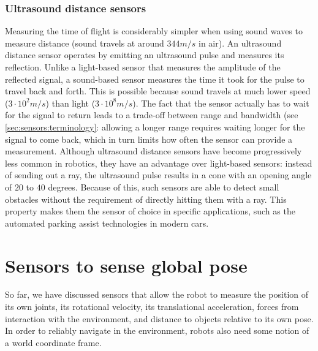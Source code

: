 \subsubsection{Ultrasound distance sensors}
\label{sec:sensors:sound}

Measuring the time of flight is considerably simpler when using sound waves to measure distance (sound travels at around $344m/s$ in air). An ultrasound distance sensor operates by emitting an ultrasound pulse and measures its reflection. Unlike a light-based sensor that measures the amplitude of the reflected signal, a sound-based sensor measures the time it took for the pulse to travel back and forth.
This is possible because sound travels at much lower speed ($3\cdot10^2m/s$) than light ($3\cdot10^8m/s$). The fact that the sensor actually has to wait for the signal to return leads to a trade-off between range and bandwidth (see \cref{sec:sensors:terminology}: allowing a longer range requires waiting longer for the signal to come back, which in turn limits how often the sensor can provide a measurement.
Although ultrasound distance sensors have become progressively less common in robotics, they have an advantage over light-based sensors: instead of sending out a ray, the ultrasound pulse results in a cone with an opening angle of $20$ to $40$ degrees. Because of this, such sensors are able to detect small obstacles without the requirement of directly hitting them with a ray. This property makes them the sensor of choice in specific applications, such as the automated parking assist technologies in modern cars.



\section{Sensors to sense global pose}
\label{sec:sensors:globalpose}
So far, we have discussed sensors that allow the robot to measure the position of its own joints,  its rotational velocity, its translational acceleration, forces from interaction with the environment, and distance to objects relative to its own pose. In order to reliably navigate in the environment, robots also need some notion of a world coordinate frame.  

